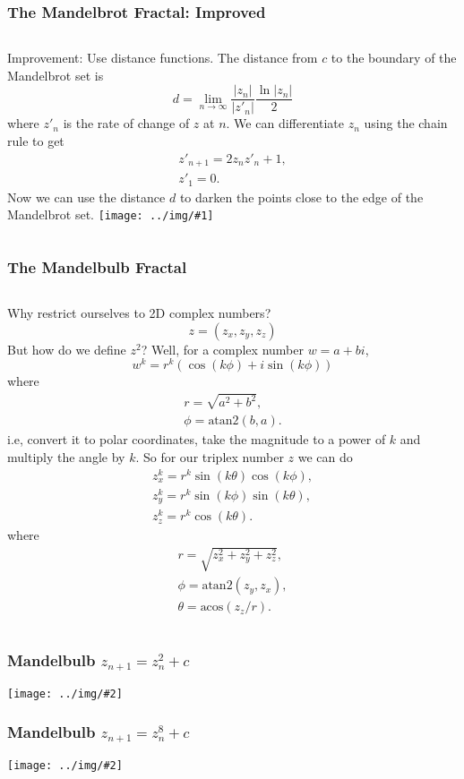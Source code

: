 \documentclass{beamer}
\newcommand\graphic[1]{\texttt{[image: ../img/\#1]}}
\newcommand\imageframe[2]{
    \begin{frame}
        \frametitle{#1}
        \texttt{[image: ../img/\#2]}
    \end{frame}
}
\begin{document}
\begin{frame}
    \frametitle{The Mandelbrot Fractal: Improved}
    \begin{columns}
        Improvement: Use distance functions. The distance from $c$ to the
        boundary of the Mandelbrot set is
        \[
            d = \lim_{n\to\infty}
                \frac{ \left|z_n\right| }{ \left|z'_n\right| }
                \frac{ \ln \left|z_n\right| }{ 2 }
        \]
        where $z'_n$ is the rate of change of $z$ at $n$. We can
        differentiate $z_n$ using the chain rule to get
        \begin{gather*}
            z'_{n+1} = 2z_nz'_n + 1,\\
            z'_1 = 0.
        \end{gather*}
        Now we can use the distance $d$ to darken the points close to the edge
        of the Mandelbrot set.
        \graphic{mandelbrot-dist-func.png}
    \end{columns}
\end{frame}

\begin{frame}
    \frametitle{The Mandelbulb Fractal}
    \begin{columns}
        Why restrict ourselves to 2D complex numbers?
        \[
            z=(z_x,z_y,z_z)
        \]
        \pause
        But how do we define $z^2$? Well, for a complex number $w=a+bi$,
        \[
            w^k = r^k(\cos(k\phi)+i\sin(k\phi))
        \]
        where
        \begin{gather*}
            r=\sqrt{a^2+b^2},\\
            \phi=\text{atan2}(b,a).
        \end{gather*}
        i.e, convert it to polar coordinates, take the magnitude to a power of $k$
        and multiply the angle by $k$.
        \pause
        So for our triplex number $z$ we can do
        \begin{gather*}
            z_x^k = r^k\sin(k\theta)\cos(k\phi),\\
            z_y^k = r^k\sin(k\phi)\sin(k\theta),\\
            z_z^k = r^k\cos(k\theta).
        \end{gather*}
        where
        \begin{gather*}
            r=\sqrt{z_x^2+z_y^2+z_z^2},\\
            \phi=\text{atan2}(z_y,z_x),\\
            \theta=\text{acos}(z_z/r).
        \end{gather*}
    \end{columns}
\end{frame}

\imageframe{Mandelbulb $z_{n+1}=z_n^2+c$}{mandelbulb2.png}
\imageframe{Mandelbulb $z_{n+1}=z_n^8+c$}{mandelbulb8.png}
\end{document}
